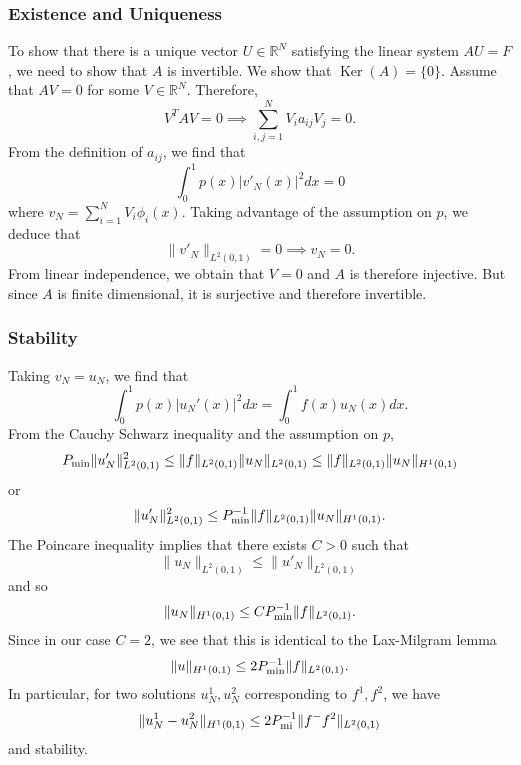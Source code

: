 \documentclass{article}
\theoremstyle{definition}
\theoremstyle{definition}
\newcommand{\R}{\mathbb{R}}
\begin{document}
\subsubsection{Existence and Uniqueness}
To show that there is a unique vector $U\in \R^N$ satisfying the linear system $AU=F$, we need to show that $A$ is invertible. We show that $\operatorname{Ker}(A)=\{0\}$. Assume that $AV=0$ for some $V\in \R^N$. Therefore,
$$V^TAV=0 \implies \sum_{i,j=1}^{N}V_ia_{ij}V_j=0.$$
From the definition of $a_{ij}$, we find that
$$\int_{0}^{1}p(x)|v'_N(x)|^2dx=0$$
where $v_N=\sum_{i=1}^{N}V_i\phi_i(x)$. Taking advantage of the assumption on $p$, we deduce that
$$\|v'_N\|_{L^2(0,1)}=0 \implies v_N=0.$$
From linear independence, we obtain that $V=0$ and $A$ is therefore injective. But since $A$ is finite dimensional, it is surjective and therefore invertible.

\subsubsection{Stability}
Taking $v_N=u_N$, we find that
$$\int_{0}^{1}p(x)|u_N'(x)|^2dx=\int_{0}^{1}f(x)u_N(x)dx.$$
From the Cauchy Schwarz inequality and the assumption on $p$,
$$P_{\rm min}\|u'_N\|^2_{L^2(0,1)}\leq \|f\|_{L^2(0,1)}\|u_N\|_{L^2(0,1)}\leq \|f\|_{L^2(0,1)}\|u_N\|_{H^1(0,1)}$$
or
$$\|u_{N}'\|^2_{L^2(0,1)}\leq P^{-1}_{\rm min}\|f\|_{L^2(0,1)}\|u_N\|_{H^1(0,1)}.$$
The Poincare inequality implies that there exists $C>0$ such that
$$\|u_N\|_{L^2(0,1)}\leq \|u'_N\|_{L^2(0,1)}$$
and so
$$\|u_N\|_{H^1(0,1)}\leq CP^{-1}_{\rm min}\|f\|_{L^2(0,1)}.$$
Since in our case $C=2$, we see that this is identical to the Lax-Milgram lemma
$$\|u\|_{H^1(0,1)}\leq 2P^{-1}_{\rm min}\|f\|_{L^2(0,1)}.$$
In particular, for two solutions $u^1_N,u^2_N$ corresponding to $f^1,f^2$, we have
$$\|u^1_N-u^2_N\|_{H^1(0,1)}\leq 2P^{-1}_{\rm mi}\|f^-f^2\|_{L^2(0,1)}$$
and stability.
\end{document}
